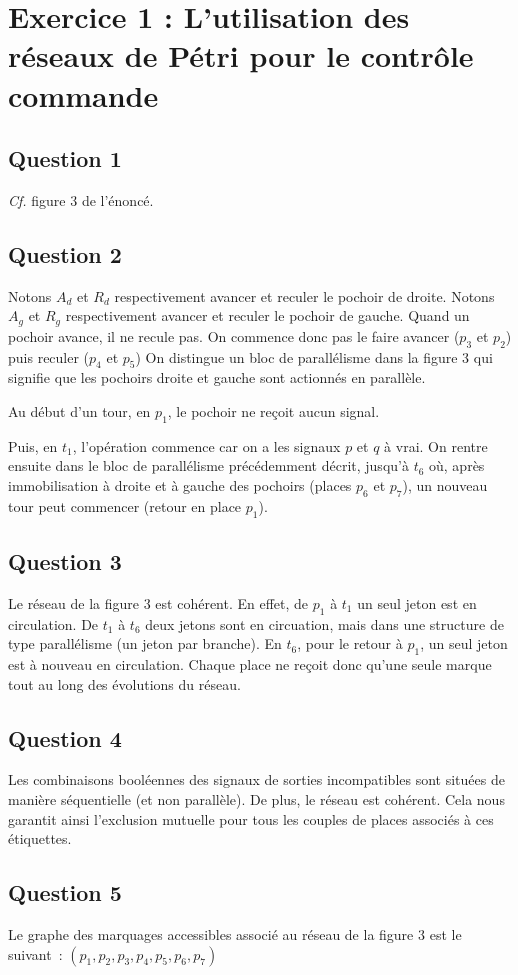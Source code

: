 \section*{Exercice 1 : L'utilisation des réseaux de Pétri pour le
  contrôle commande}
\subsection*{Question 1}
\textit{Cf.} figure $3$ de l'énoncé.
\subsection*{Question 2}
Notons $A_d$ et $R_d$ respectivement avancer et reculer le pochoir de
droite.  Notons $A_g$ et $R_g$ respectivement avancer et reculer le
pochoir de gauche.  Quand un pochoir avance, il ne recule pas.  On
commence donc pas le faire avancer ($p_3$ et $p_2$) puis reculer
($p_4$ et $p_5$) On distingue un bloc de parallélisme dans la figure 3
qui signifie que les pochoirs droite et gauche sont actionnés en
parallèle.

Au début d'un tour, en $p_1$, le pochoir ne reçoit aucun signal.  

Puis, en $t_1$, l'opération commence car on a les signaux $p$ et $q$ à
vrai. On rentre ensuite dans le bloc de parallélisme précédemment
décrit, jusqu'à $t_6$ où, après immobilisation à droite et à gauche
des pochoirs (places $p_6$ et $p_7$), un nouveau tour peut commencer
(retour en place $p_1$).
\subsection*{Question 3}
Le réseau de la figure $3$ est cohérent. En effet, de $p_1$ à $t_1$ un
seul jeton est en circulation. De $t_1$ à $t_6$ deux jetons sont en
circuation, mais dans une structure de type parallélisme (un jeton par
branche). En $t_6$, pour le retour à $p_1$, un seul jeton est à
nouveau en circulation. Chaque place ne reçoit donc qu'une seule
marque tout au long des évolutions du réseau.
\subsection*{Question 4}
Les combinaisons booléennes des signaux de sorties incompatibles sont
situées de manière séquentielle (et non parallèle). De plus, le réseau
est cohérent. Cela nous garantit ainsi l'exclusion mutuelle pour tous
les couples de places associés à ces étiquettes.
\subsection*{Question 5}
Le graphe des marquages accessibles associé au réseau de la figure $3$
est le suivant~:
$(p_1, p_2, p_3, p_4, p_5, p_6, p_7)$

